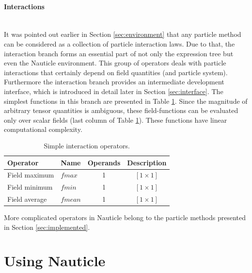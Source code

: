 \documentclass[a4paper,12pt,openany]{book}
\newcommand{\myparagraph}[1]{\paragraph{#1}\mbox{}\\}
\theoremstyle{break}
\begin{document}
\myparagraph{Interactions}
It was pointed out earlier in Section \ref{sec:environment} that any particle method can be considered as a collection of particle interaction laws. Due to that, the interaction branch forms an essential part of not only the expression tree but even the Nauticle environment. This group of operators deals with particle interactions that certainly depend on field quantities (and particle system). Furthermore the interaction branch provides an intermediate development interface, which is introduced in detail later in Section \ref{sec:interface}.
The simplest functions in this branch are presented in Table \ref{tbl:fsearch}. Since the magnitude of arbitrary tensor quantities is ambiguous, these field-functions can be evaluated only over scalar fields (last column of Table \ref{tbl:fsearch}). These functions have linear computational complexity.
\begin{table}
\begin{center}
\caption{Simple interaction operators.}\label{tbl:fsearch}
\begin{tabular}{ l l c c }
\toprule[1.5pt]
\bf Operator & \bf Name & \bf Operands & \bf Description\\
\midrule
Field maximum & $fmax$ & 1 & $[1 \times 1]$\\ 
Field minimum & $fmin$ & 1 & $[1 \times 1]$\\ 
Field average & $fmean$ & 1 & $[1 \times 1]$\\
\bottomrule[1.25pt]
\end{tabular}
\end{center}
\end{table}
More complicated operators in Nauticle belong to the particle methods presented in Section \ref{sec:implemented}.


\section{Using Nauticle}
\end{document}
